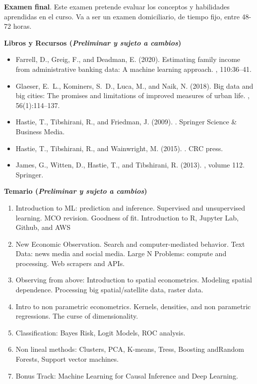 \documentclass[11pt]{article}
\begin{document}
{\bf Examen final}. Este examen pretende evaluar los conceptos y habilidades aprendidas en el curso. Va a ser un examen domiciliario, de tiempo fijo, entre 48-72 horas.

\bigskip

{\bf \Large Libros y Recursos ({\it Preliminar y sujeto a cambios})}
\medskip

\begin{itemize}
	\item Farrell, D., Greig, F., and Deadman, E. (2020).
\newblock Estimating family income from administrative banking data: A machine
  learning approach.
, 110:36--41.


\item Glaeser, E.~L., Kominers, S.~D., Luca, M., and Naik, N. (2018).
\newblock Big data and big cities: The promises and limitations of improved
  measures of urban life.
, 56(1):114--137.


\item Hastie, T., Tibshirani, R., and Friedman, J. (2009).
.
\newblock Springer Science \& Business Media.

\item Hastie, T., Tibshirani, R., and Wainwright, M. (2015).
.
\newblock CRC press.


\item James, G., Witten, D., Hastie, T., and Tibshirani, R. (2013).
, volume 112.
\newblock Springer.

\end{itemize}

\bigskip

{\bf \Large  Temario ({\it Preliminar y sujeto a cambios}) }
\medskip

\begin{enumerate}
 	\item Introduction to ML: prediction and inference. Supervised and unsupervised learning. MCO revision. Goodness of fit. Introduction to R, Jupyter Lab, Github, and AWS
	\item  New Economic Observation. Search and computer-mediated behavior. Text Data: news media and social media. Large N Problems: compute and processing. Web scrapers and APIs.
	\item Observing from above: Introduction to spatial econometrics. Modeling spatial dependence. Processing big spatial/satellite data, raster data.
	\item Intro to non parametric econometrics. Kernels, densities, and non parametric regressions. The curse of dimensionality.
	\item Classification: Bayes Risk, Logit Models, ROC analysis.
	\item Non lineal methods: Clusters, PCA, K-means, Tress, Boosting andRandom Forests, Support vector machines.
	\item Bonus Track: Machine Learning for Causal Inference and Deep Learning.
\end{enumerate}
\end{document}
